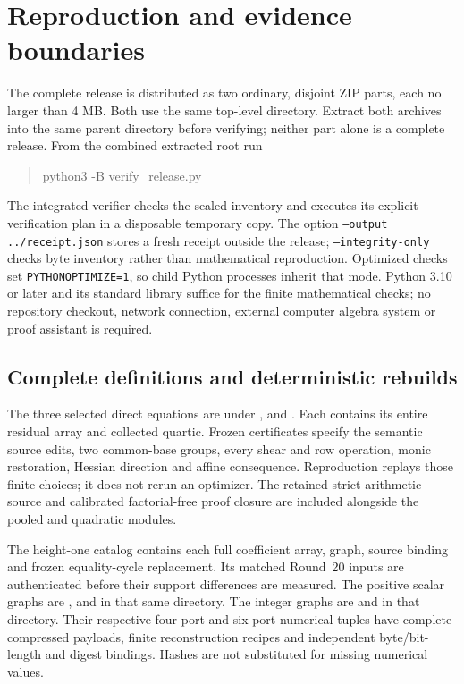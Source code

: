 \section{Reproduction and evidence boundaries}
\label{sec:verification}
The complete release is distributed as two ordinary, disjoint ZIP parts,
each no larger than 4 MB. Both use the same top-level directory. Extract
both archives into the same parent directory before verifying; neither
part alone is a complete release. From the combined extracted root run
\begin{quote}\ttfamily
python3 -B verify\_release.py
\end{quote}
The integrated verifier checks the sealed inventory and executes its
explicit verification plan in a disposable temporary copy. The option
\texttt{--output ../receipt.json} stores a fresh receipt outside the
release; \texttt{--integrity-only} checks byte inventory rather than
mathematical reproduction. Optimized checks set
\texttt{PYTHONOPTIMIZE=1}, so child Python processes inherit that mode.
Python 3.10 or later and its standard library suffice for the finite
mathematical checks; no repository checkout, network connection,
external computer algebra system or proof assistant is required.

\subsection{Complete definitions and deterministic rebuilds}
The three selected direct equations are under
,  and
. Each contains its entire residual array
and collected quartic. Frozen certificates specify the semantic source
edits, two common-base groups, every shear and row operation, monic
restoration, Hessian direction and affine consequence. Reproduction
replays those finite choices; it does not rerun an optimizer.
The retained strict arithmetic source and calibrated factorial-free
proof closure are included alongside the pooled and quadratic modules.

The height-one catalog contains each full coefficient array, graph,
source binding and frozen equality-cycle replacement. Its matched
Round~20 inputs are authenticated before their support differences
are measured. The positive scalar graphs are
,
 and
 in that same directory.
The integer graphs are
 and
 in that directory.
Their respective four-port and six-port numerical tuples have complete
compressed payloads, finite reconstruction recipes and independent
byte/bit-length and digest bindings. Hashes are not substituted for
missing numerical values.

